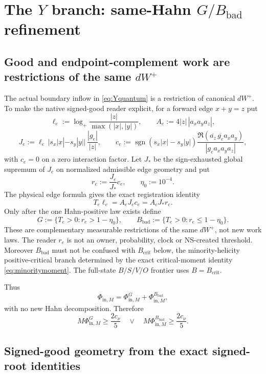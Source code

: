\documentclass[11pt]{article}
\begin{document}
\section{The $Y$ branch: same-Hahn $G/B_{\mathrm{bad}}$ refinement}

\subsection{Good and endpoint-complement work are restrictions of the same $dW^+$}

The actual boundary inflow in \eqref{eq:Yquantum} is a restriction of canonical $dW^+$.  To make the native signed-good reader explicit, for a forward edge $x+y=z$ put
\[
\ell_e:=\log_+\frac{|z|}{\max(|x|,|y|)},
\qquad
A_e:=4|z|\,|a_xa_ya_z|,
\]
\[
J_e:=\ell_e\,|s_x|x|-s_y|y||\,\frac{|g_e|}{|z|},
\qquad
c_e:=\operatorname{sgn}(s_x|x|-s_y|y|)
\frac{\Re(\overline{a_z}\,\overline{g_e}a_xa_y)}{|g_ea_xa_ya_z|},
\]
with $c_e=0$ on a zero interaction factor.  Let $J_*$ be the sign-exhausted global supremum of $J_e$ on normalized admissible edge geometry and put
\[
r_e:=\frac{J_e}{J_*}c_e,
\qquad \eta_0:=10^{-4}.
\]
The physical edge formula gives the exact registration identity
\begin{equation}\label{eq:nativeEfficiency}
\boxed{T_e\ell_e=A_eJ_ec_e=A_eJ_*r_e.}
\end{equation}
Only after the one Hahn-positive law exists define
\[
G:=\{T_e>0:r_e>1-\eta_0\},
\qquad
B_{\mathrm{bad}}:=\{T_e>0:r_e\le1-\eta_0\}.
\]
These are complementary measurable restrictions of the same $dW^+$, not new work laws.  The reader $r_e$ is not an owner, probability, clock or NS-created threshold.  Moreover $B_{\mathrm{bad}}$ must not be confused with $B_{\mathrm{crit}}$ below, the minority-helicity positive-critical branch determined by the exact critical-moment identity \eqref{eq:minoritymoment}.  The full-state $B/S/V/O$ frontier uses $B=B_{\mathrm{crit}}$.

Thus
\[
\Phi_{\mathrm{in},M}
=
\Phi_{\mathrm{in},M}^{G}
+
\Phi_{\mathrm{in},M}^{B_{\mathrm{bad}}},
\]
with no new Hahn decomposition.  Therefore
\begin{equation}\label{eq:GBhalf}
\boxed{
M\Phi_{\mathrm{in},M}^{G}\ge\frac{2c_\nu}{5}
\quad\vee\quad
M\Phi_{\mathrm{in},M}^{B_{\mathrm{bad}}}\ge\frac{2c_\nu}{5}.
}
\end{equation}

\subsection{Signed-good geometry from the exact signed-root identities}
\end{document}
